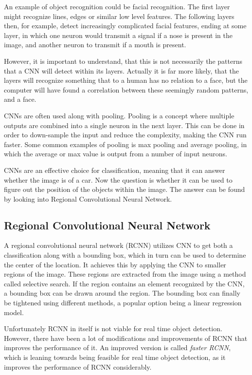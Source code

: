 An example of object recognition could be facial recognition.
The first layer might recognize lines, edges or similar low level features.
The following layers then, for example, detect increasingly complicated facial features, ending at some layer, in which one neuron would transmit a signal if a nose is present in the image, and another neuron to transmit if a mouth is present.


However, it is important to understand, that this is not necessarily the patterns that a CNN will detect within its layers.
Actually it is far more likely, that the layers will recognize something that to a human has no relation to a face, but the computer will have found a correlation between these seemingly random patterns, and a face.

CNNs are often used along with pooling.
Pooling is a concept where multiple outputs are combined into a single neuron in the next layer.
This can be done in order to down-sample the input and reduce the complexity, making the CNN run faster.
Some common examples of pooling is max pooling and average pooling, in which the average or max value is output from a number of input neurons.

CNNs are an effective choice for classification, meaning that it can answer whether the image is of a car.
Now the question is whether it can be used to figure out the position of the objects within the image.
The answer can be found by looking into Regional Convolutional Neural Network.


\subsection{Regional Convolutional Neural Network}
A regional convolutional neural network (RCNN) utilizes CNN to get both a classification along with a bounding box, which in turn can be used to determine the center of the location.
It achieves this by applying the CNN to smaller regions of the image. 
These regions are extracted from the image using a method called selective search.
If the region contains an element recognized by the CNN, a bounding box can be drawn around the region.
The bounding box can finally be tightened using different methods, a popular option being a linear regression model.\cite{CNNHistory}

Unfortunately RCNN in itself is not viable for real time object detection.
However, there have been a lot of modifications and improvements of RCNN that improves the performance of it.
An improved version is called \textit{faster RCNN}, which is leaning towards being feasible for real time object detection, as it improves the performance of RCNN considerably\cite{fasterRCNN}.

